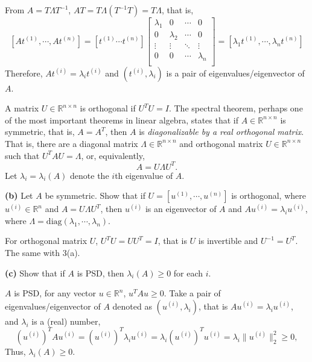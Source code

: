 \documentclass[11pt]{article}
\renewcommand\part[1]{\vspace{.10in}\textbf{(#1)  }}
\begin{document}
From $A = T\Lambda T^{-1}$, $AT = T\Lambda(T^{-1}T)=T\Lambda$, that is, $$[At^{(1)}, \cdots, At^{(n)}] = [t^{(1)} \cdots t^{(n)}]\left[
                                                \begin{array}{cccc}
                                                  \lambda_1 & 0 & \cdots & 0 \\
                                                  0 & \lambda_2 & \cdots & 0 \\
                                                  \vdots & \vdots & \ddots & \vdots \\
                                                  0 & 0 & \cdots & \lambda_n \\
                                                \end{array}
                                              \right] = [\lambda_1t^{(1)}, \cdots, \lambda_nt^{(n)}]$$
Therefore, $At^{(i)} = \lambda_it^{(i)}$ and $(t^{(i)}, \lambda_i)$ is a pair of eigenvalues/eigenvector of $A$.

A matrix $U \in \mathbb{R}^{n\times n}$ is orthogonal if $U^TU = I$. The spectral theorem, perhaps one of the most important theorems in linear algebra, states that if $A \in \mathbb{R}^{n\times n}$ is symmetric, that is, $A = A^T$,
then $A$ is \emph{diagonalizable by a real orthogonal matrix}. That is, there are a diagonal matrix $\Lambda\in \mathbb{R}^{n\times n}$ and orthogonal matrix $U \in \mathbb{R}^{n\times n}$ such that $U^TAU = \Lambda$, or, equivalently, $$A = U\Lambda U^T.$$
Let $\lambda_i = \lambda_i(A)$ denote the $i$th eigenvalue of $A$.

\part{b}Let $A$ be symmetric. Show that if $U = [u^{(1)}, \cdots, u^{(n)}]$ is orthogonal, where $u^{(i)} \in \mathbb{R}^n$ and $A = U\Lambda U^T$, then $u^{(i)}$ is an eigenvector of $A$ and $Au^{(i)} = \lambda_i u^{(i)}$, where $\Lambda = \text{diag}(\lambda_1, \cdots, \lambda_n)$.

For orthogonal matrix $U$, $U^TU = UU^T = I$, that is $U$ is invertible and $U^{-1} = U^T$. The same with 3(a).

\part{c}Show that if $A$ is PSD, then $\lambda_i(A) \geq 0$ for each $i$.

$A$ is PSD, for any vector $u\in \mathbb{R}^n$, $u^TAu \geq 0$. Take a pair of eigenvalues/eigenvector of $A$ denoted as $(u^{(i)}, \lambda_i)$, that is $Au^{(i)} = \lambda_iu^{(i)}$, and $\lambda_i $ is a (real) number,
$$(u^{(i)})^TAu^{(i)} = (u^{(i)})^T\lambda_iu^{(i)} = \lambda_i (u^{(i)})^Tu^{(i)} = \lambda_i \|u^{(i)}\|_2^2 \geq 0,$$
Thus, $\lambda_i(A) \geq 0$.
\end{document}
